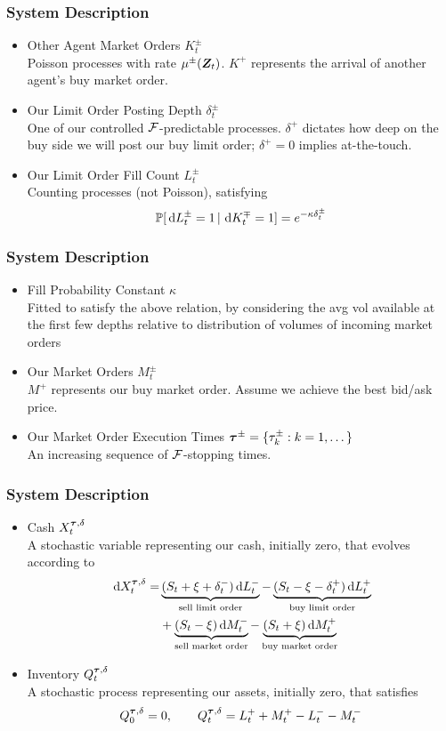 \begin{frame}
\frametitle{System Description}
\begin{itemize}
\item Other Agent Market Orders $K^{\pm}_t$ \\
    Poisson processes with rate $\mu^{\pm}(\bm{Z}_t)$. $K^+$ represents the arrival of another agent's buy market order.
\item Our Limit Order Posting Depth $\delta^{\pm}_t$ \\
    One of our controlled $\mathcal{F}$-predictable processes. $\delta^+$ dictates how deep on the buy side we will post our buy limit order; $\delta^+ = 0$ implies at-the-touch.
\item Our Limit Order Fill Count $L^{\pm}_t$ \\
    Counting processes (not Poisson), satisfying
    \[ \mathbb{P} [\,\mathrm{d} L^{\pm}_t = 1 \, | \, \,\mathrm{d} K^{\mp}_t = 1] = e^{-\kappa \delta^{\pm}_t} \]
\end{itemize}
\end{frame}

\begin{frame}
\frametitle{System Description}
\begin{itemize}
\item Fill Probability Constant $\kappa$ \\
    Fitted to satisfy the above relation, by considering the avg vol available at the first few depths relative to distribution of volumes of incoming market orders
\item Our Market Orders $M^{\pm}_t$ \\
    $M^+$ represents our buy market order. Assume we achieve the best bid/ask price.
\item Our Market Order Execution Times $\bm{\tau}^\pm = \{ \tau^\pm_k : k = 1, \dots \}$ \\
    An increasing sequence of $\mathcal{F}$-stopping times.
\end{itemize}
\end{frame}

\begin{frame}
\frametitle{System Description}
\begin{itemize}
\item Cash $X^{\bm{\tau}, \delta}_t$ \\
    A stochastic variable representing our cash, initially zero, that evolves according to
\[ \begin{aligned}
\,\mathrm{d} X^{\bm{\tau}, \delta}_t = & \underbrace{(S_t + \xi + \delta^{-}_t) \,\mathrm{d} L^{-}_t}_{\text{sell limit order}} - \underbrace{(S_t - \xi - \delta^{+}_t) \,\mathrm{d} L^{+}_t}_{\text{buy limit order}} \\
                         & + \underbrace{(S_t - \xi) \,\mathrm{d} M^{-}_t}_{\text{sell market order}} - \underbrace{(S_t + \xi) \,\mathrm{d} M^{+}_t}_{\text{buy market order}}
\end{aligned} \]
\item Inventory $Q^{\bm{\tau}, \delta}_t$ \\
    A stochastic process representing our assets, initially zero, that satisfies
\[ Q^{\bm{\tau}, \delta}_0 = 0, \qquad Q^{\bm{\tau}, \delta}_t = L^+_t + M^+_t - L^-_t - M^-_t \]
\end{itemize}
\end{frame}

